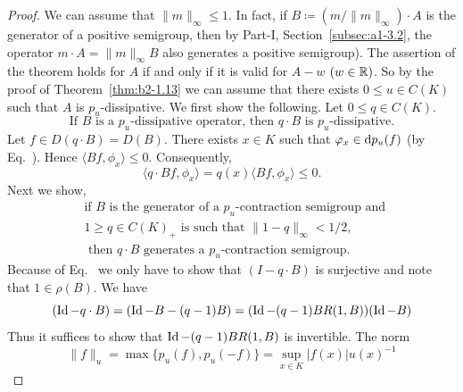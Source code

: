 \begin{proof}
We can assume that $\|m\|_{\infty} \leq 1$.
In fact, if\/ $B \coloneq (m/\|m\|_{\infty}) \cdot A$ is the generator of a positive semigroup, then by 
Part-I, Section~\ref{subsec:a1-3.2}, the operator $m \cdot A = \|m\|_{\infty}B$ also generates a positive semigroup).
The assertion of the theorem holds for $A$ if and only if it is valid for $A - w$ $(w \in \mathbb{R})$.
So by the proof of Theorem~\ref{thm:b2-1.13} we can assume that there exists $0 \leq  u \in C(K)$ such that $A$ is $p_{u}$-dissipative.
We first show the following. Let $0 \leq  q \in C(K)$.
\begin{equation}\label{eq:b2-1.11}
\text{If } B \text{ is a } p_{u}\text{-dissipative operator, then } q \cdot B \text{ is } p_{u}\text{-dissipative.}
\end{equation}
Let $f \in D(q \cdot B) = D(B)$.
There exists $x \in K$ such that $\phi_{x} \in \ddp_{u}(f)$ (by Eq.~). 
Hence $\langle Bf,\phi_{x} \rangle \leq 0$.
Consequently, 
%
\[
	\langle q \cdot Bf,\phi_{x} \rangle = q(x)\langle Bf,\phi_{x} \rangle \leq 0 .
\]
%
Next we show,
\begin{equation}\label{eq:b2-1.12}
\begin{split}
&\text{if } B \text{ is the generator of a } p_{u}\text{-contraction semigroup and } \\
&1 \geq q \in C(K)_{+} \text{ is such that } \|1 - q\|_{\infty} < 1/2,  \\
&\text{ then } q \cdot B \text{ generates a } p_{u}\text{-contraction semigroup.}
\end{split}
\end{equation}
Because of Eq.~ we only have to show that 
$(I - q \cdot B)$ is surjective and note that $1 \in \rho(B)$.
We have 
\[
	( \operatorname{Id} - q \cdot B) = (\operatorname{Id} - B - (q-1)B) = (\operatorname{Id} - (q-1)BR(1,B))(\operatorname{Id} - B)
\]
Thus it suffices to show that $\operatorname{Id} - (q-1)BR(1,B)$ is invertible.
The norm 
\[
	\|f\|_{u} = \max\{p_{u}(f), p_{u}(-f) \} = \sup_{x \in K} |f(x)| u(x)^{-1}
\]
\end{proof}
